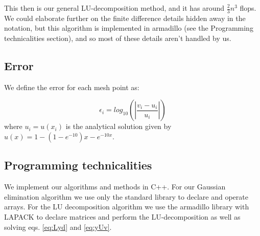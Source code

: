 This then is our general LU-decomposition method, and it has around
$\frac{2}{3}n^3$ flops. We could elaborate further on the finite difference
details hidden away in the notation, but this algorithm is implemented in
armadillo (see the Programming technicalities section), and so most of these details
aren't handled by us.

\subsection{Error}
\label{sec:error}

We define the error for each mesh point as:

	\begin{equation}
	\epsilon_i=log_{10}\left(\left|\frac{v_i-u_i}{u_i}\right|\right)
	\end{equation}
where $u_i=u(x_i)$ is the analytical solution given by $u(x) = 1-(1-e^{-10})x-e^{-10x}$.

\subsection{Programming technicalities}
\label{sec:proglang}

We implement our algorithms and methods in C++. For our Gaussian elimination
algorithm we use only the standard library to declare and operate arrays.
For the LU decomposition algorithm we use the armadillo library with LAPACK to
declare matrices and perform the LU-decomposition as well as solving eqs.
\ref{eq:Lyd} and \ref{eq:yUv}.
